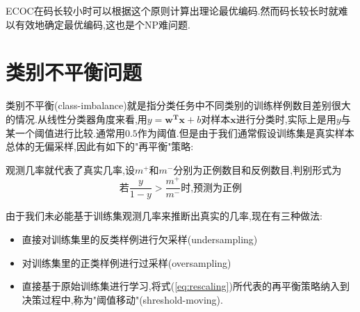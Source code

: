 ECOC在码长较小时可以根据这个原则计算出理论最优编码.然而码长较长时就难以有效地确定最优编码,这也是个NP难问题.

\section{类别不平衡问题}

类别不平衡(class-imbalance)就是指分类任务中不同类别的训练样例数目差别很大的情况.从线性分类器角度来看,用$y=\mathbf{w^Tx}+b$对样本$\mathbf x$进行分类时,实际上是用$y$与某一个阈值进行比较.通常用$0.5$作为阈值.但是由于我们通常假设训练集是真实样本总体的无偏采样,因此有如下的"再平衡"策略:

观测几率就代表了真实几率,设$m^+$和$m^-$分别为正例数目和反例数目,判别形式为
\begin{equation}\label{eq:rescaling}
\text{若}\frac{y}{1-y}>\frac{m^+}{m^-}\text{时,预测为正例}
\end{equation}

由于我们未必能基于训练集观测几率来推断出真实的几率,现在有三种做法:
\begin{itemize}
\item 直接对训练集里的反类样例进行欠采样(undersampling)
\item 对训练集里的正类样例进行过采样(oversampling)
\item 直接基于原始训练集进行学习,将式(\ref{eq:rescaling})所代表的再平衡策略纳入到决策过程中,称为"阈值移动"(shreshold-moving).
\end{itemize}